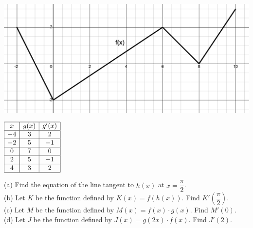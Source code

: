 \\
\begin{minipage}[t]{0.75\textwidth} \vspace{0pt}%
    \includegraphics[width = \textwidth]{Support/Chapter 1 Graphics/1.7-Graphic7.png}
\end{minipage} \hfill \begin{minipage}[t]{0.2\textwidth} \vspace{11pt}%
    \def\arraystretch{1.4}
    $\begin{array}{|c|c|c|}
        \hline
        x & g(x) & g'(x) \\ \hline
        -4 & 3 & 2 \\ \hline
        -2 & 5 & -1 \\ \hline
        0 & 7 & 0 \\ \hline
        2 & 5 & -1 \\ \hline
        4 & 3 & 2 \\
        \hline
    \end{array}$
\end{minipage} 

(a) Find the equation of the line tangent to $h(x)$ at $x = \dfrac{\pi}{2}$. \\[11pt]
(b) Let $K$ be the function defined by $K(x) = f(h(x))$. Find $K'\left(\dfrac{\pi}{2}\right)$. \\[11pt]
(c) Let $M$ be the function defined by $M(x) = f(x) \cdot g(x)$. Find $M'(0)$. \\[11pt]
(d) Let $J$ be the function defined by $J(x) = g(2x) \cdot f(x)$. Find $J'(2)$. \\[11pt]

 \\[11pt]

